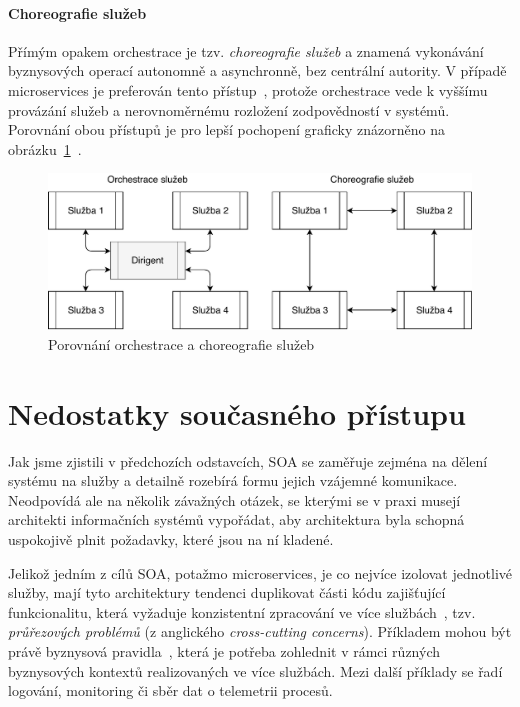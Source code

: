 \paragraph{Choreografie služeb}
Přímým opakem orchestrace je tzv. \textit{choreografie služeb} a znamená
vykonávání byznysových operací autonomně a asynchronně, bez centrální
autority. V případě microservices je preferován tento přístup~\cite{dragoni2017microservices},
protože orchestrace vede k vyššímu provázání služeb a nerovnoměrnému rozložení
zodpovědností v systémů. Porovnání obou přístupů je pro lepší pochopení graficky
znázorněno na obrázku~\ref{fig:choreography-orchestration}~\cite{orchestrationvschoreography}.

\begin{figure}
    \centering
    \includegraphics[keepaspectratio=true, width=0.8\linewidth]{figures/choreography-orchestration.pdf}
    \caption{Porovnání orchestrace a choreografie služeb}
    \label{fig:choreography-orchestration}
\end{figure}

\section{Nedostatky současného přístupu}

Jak jsme zjistili v předchozích odstavcích, SOA se zaměřuje zejména na
dělení systému na služby a detailně rozebírá formu jejich vzájemné komunikace.
Neodpovídá ale na několik závažných otázek, se kterými se v praxi musejí
architekti informačních systémů vypořádat, aby architektura byla schopná uspokojivě
plnit požadavky, které jsou na ní kladené.

Jelikož jedním z cílů SOA, potažmo microservices, je co nejvíce izolovat
jednotlivé služby, mají tyto architektury tendenci duplikovat části kódu
zajišťující funkcionalitu, která vyžaduje konzistentní zpracování ve více
službách~\cite{cerny2017disambiguation}, tzv. \textit{průřezových
problémů} (z anglického \textit{cross-cutting concerns}).
Příkladem mohou být právě byznysová pravidla~\cite{cemus2014aspect}, která je potřeba
zohlednit v rámci různých byznysových kontextů realizovaných ve více službách.
Mezi další příklady se řadí logování, monitoring či sběr dat
o telemetrii procesů.

